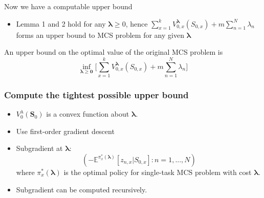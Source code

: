 \documentclass{beamer}
\newcommand{\Sv}{\mathbf{S}}
\newcommand{\lambdav}{\pmb{\lambda}}
\begin{document}
\begin{frame}{Now we have a computable upper bound}
\begin{itemize}
\item Lemma 1 and 2 hold for any $\lambdav\geq 0$, hence $\sum_{x=1}^k V_{0,x}^{\lambdav}(S_{0,x})+m\sum_{n=1}^N\lambda_{n}$ forms an upper bound to MCS problem for any given $\lambdav$
\end{itemize}
\begin{theorem}
An upper bound on the optimal value of the original MCS problem is
\begin{equation}\label{upperB}
\inf_{\lambdav\geq \mathbf{0}}\Big[ \sum_{x=1}^k V_{0,x}^{\lambdav}(S_{0,x})+m\sum_{n=1}^N\lambda_{n}\Big] 
\end{equation}
\end{theorem}


\end{frame}

\begin{frame}
\frametitle{Compute the tightest possible upper bound}
\begin{itemize}
\item $V_0^{\lambda}(\Sv_0)$ is a convex function about $\lambdav$.
\item Use first-order gradient descent
\item Subgradient at $\lambdav$:
\[(-\mathbb{E}^{\pi_x^*(\lambdav)}[z_{n,x}|S_{0,x}]:n=1,...,N)\]
where $\pi_x^*(\lambdav)$ is the optimal policy for single-task MCS problem with cost $\lambdav$.
\item Subgradient can be computed recursively.
\end{itemize}
\end{frame}
\end{document}
